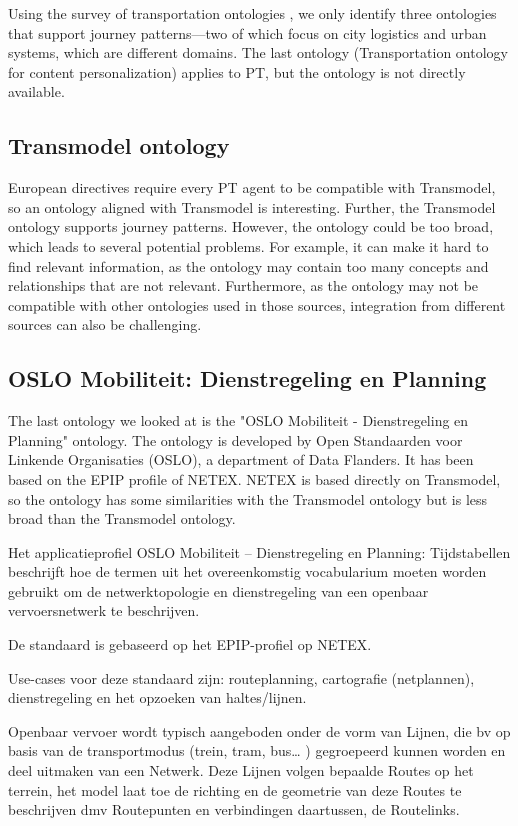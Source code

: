 Using the survey of transportation ontologies \cite{katsumi_ontologies_2018}, we only identify three ontologies that support journey patterns—two of which focus on city logistics and urban systems, which are different domains. The last ontology (Transportation ontology for content personalization) applies to PT, but the ontology is not directly available.

\subsection{Transmodel ontology}
European directives require every PT agent to be compatible with Transmodel, so an ontology aligned with Transmodel is interesting. Further, the Transmodel ontology supports journey patterns. However, the ontology could be too broad, which leads to several potential problems. For example, it can make it hard to find relevant information, as the ontology may contain too many concepts and relationships that are not relevant. Furthermore, as the ontology may not be compatible with other ontologies used in those sources, integration from different sources can also be challenging.

\subsection{OSLO Mobiliteit: Dienstregeling en Planning}
The last ontology we looked at is the "OSLO Mobiliteit - Dienstregeling en Planning" \cite{noauthor_oslo_2023} ontology. The ontology is developed by Open Standaarden voor Linkende Organisaties (OSLO), a department of Data Flanders. It has been based on the EPIP profile of NETEX. NETEX is based directly on Transmodel, so the ontology has some similarities with the Transmodel ontology but is less broad than the Transmodel ontology.

 Het applicatieprofiel OSLO Mobiliteit – Dienstregeling en Planning: Tijdstabellen beschrijft hoe de termen uit het overeenkomstig vocabularium moeten worden gebruikt om de netwerktopologie en dienstregeling van een openbaar vervoersnetwerk te beschrijven.

De standaard is gebaseerd op het EPIP-profiel op NETEX.

Use-cases voor deze standaard zijn: routeplanning, cartografie (netplannen), dienstregeling en het opzoeken van haltes/lijnen.

Openbaar vervoer wordt typisch aangeboden onder de vorm van Lijnen, die bv op basis van de transportmodus (trein, tram, bus… ) gegroepeerd kunnen worden en deel uitmaken van een Netwerk. Deze Lijnen volgen bepaalde Routes op het terrein, het model laat toe de richting en de geometrie van deze Routes te beschrijven dmv Routepunten en verbindingen daartussen, de Routelinks.


